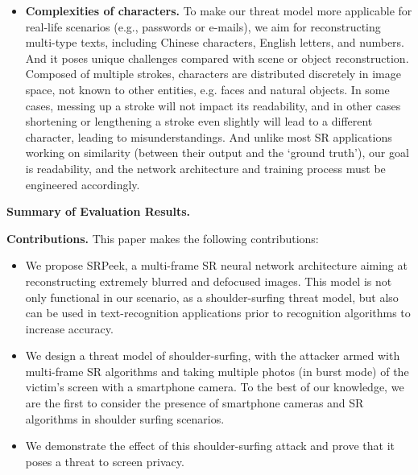 \begin{itemize}[leftmargin=*]
  \item \textbf{Complexities of characters.} To make our threat model more applicable for real-life scenarios (e.g., passwords or e-mails), we aim for reconstructing multi-type texts, including Chinese characters, English letters, and numbers. And it poses unique challenges compared with scene or object reconstruction. Composed of multiple strokes, characters are distributed discretely in image space, not known to other entities, e.g. faces and natural objects. In some cases, messing up a stroke will not impact its readability, and in other cases shortening or lengthening a stroke even slightly will lead to a different character, leading to misunderstandings. And unlike most SR applications working on similarity (between their output and the ‘ground truth’), our goal is readability, and the network architecture and training process must be engineered accordingly.
\end{itemize}


\vspace{1mm}
\noindent
\textbf{Summary of Evaluation Results.}


\vspace{1mm}
\noindent
\textbf{Contributions.} This paper makes the following contributions:
\begin{itemize}[leftmargin=*]
  \item	We propose \textsf{SRPeek}, a multi-frame SR neural network architecture aiming at reconstructing extremely blurred and defocused images. This model is not only functional in our scenario, as a shoulder-surfing threat model, but also can be used in text-recognition applications prior to recognition algorithms to increase accuracy.
  \item	We design a threat model of shoulder-surfing, with the attacker armed with multi-frame SR algorithms and taking multiple photos (in burst mode) of the victim’s screen with a smartphone camera. To the best of our knowledge, we are the first to consider the presence of smartphone cameras and SR algorithms in shoulder surfing scenarios.
  \item	We demonstrate the effect of this shoulder-surfing attack and prove that it poses a threat to screen privacy.
\end{itemize}

